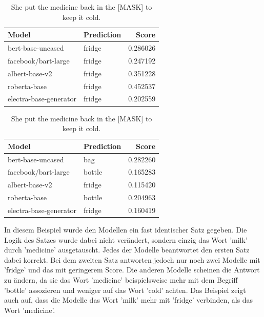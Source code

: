 \documentclass[a4paper, 11pt]{article}          %
\begin{document}
\vspace{4em}

\begin{table}[ht]
\centering
\scriptsize
\begin{minipage}[t]{0.48\linewidth}
\centering
\caption*{She put the milk back in the [MASK] to keep it cold.}
\begin{tabular}{llr}
\toprule
Model & Prediction & Score \\
\midrule
bert-base-uncased & fridge & 0.286026 \\
facebook/bart-large & fridge & 0.247192 \\
albert-base-v2 & fridge & 0.351228 \\
roberta-base & fridge & 0.452537 \\
electra-base-generator & fridge & 0.202559 \\
\bottomrule
\end{tabular}
\end{minipage}
\hfill
\begin{minipage}[t]{0.48\linewidth}
\centering
\caption*{She put the medicine back in the [MASK] to keep it cold.}
\begin{tabular}{llr}
\toprule
Model & Prediction & Score \\
\midrule
bert-base-uncased & bag & 0.282260 \\
facebook/bart-large & bottle & 0.165283 \\
albert-base-v2 & fridge & 0.115420 \\
roberta-base & bottle & 0.204963 \\
electra-base-generator & fridge & 0.160419 \\
\bottomrule
\end{tabular}
\end{minipage}
\end{table}

In diesem Beispiel wurde den Modellen ein fast identischer Satz gegeben.
Die Logik des Satzes wurde dabei nicht verändert, sondern einzig das Wort 'milk' durch 'medicine' ausgetauscht.
Jedes der Modelle beantwortet den ersten Satz dabei korrekt.
Bei dem zweiten Satz antworten jedoch nur noch zwei Modelle mit 'fridge' und das mit geringerem Score.
Die anderen Modelle scheinen die Antwort zu ändern, da sie das Wort 'medicine' beispielsweise mehr mit dem Begriff 'bottle' assozieren und weniger auf das Wort 'cold' achten.
Das Beispiel zeigt auch auf, dass die Modelle das Wort 'milk' mehr mit 'fridge' verbinden, als das Wort 'medicine'.
\end{document}

